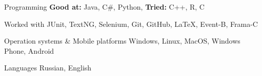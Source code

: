 


\begin{cvskills}


\cvskill
{Programming} %
{\textbf{Good at:} Java, C\#, Python, \textbf{Tried:} C++, R, C} %

\cvskill
{Worked with} %
{JUnit, TextNG, Selenium, Git, GitHub, LaTeX, Event-B, Frama-C} %

\cvskill
{Operation systems \& Mobile platforms} %
{Windows, Linux, MacOS, Windows Phone, Android} %


\cvskill
{Languages} %
{Russian, English} %


\end{cvskills}